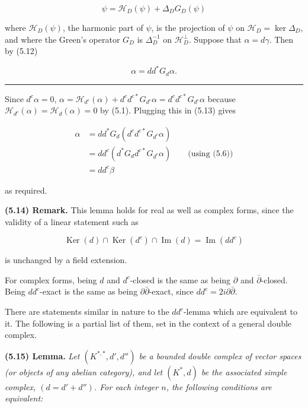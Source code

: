 \documentclass[
  english,
  a3paper,
  a3paper]{extarticle}
\begin{document}
\[\tag{5.12}\psi=\mathcal H_D(\psi)+\Delta_DG_D(\psi)\]

where \(\mathcal H_D(\psi)\), the harmonic part of \(\psi\), is the
projection of \(\psi\) on \(\mathcal H_D=\ker\Delta_D\), and where the
Green's operator \(G_D\) is \(\Delta_D^{-1}\) on \(\mathcal H_D^\perp\).
Suppose that \(\alpha=d\gamma\). Then by (5.12)

\[\tag{5.13}\alpha=dd^*G_d\alpha.\]

\clearpage



\par

\vspace{0.7mm}\hrule\vspace{1.6mm}

\fontsize{9}{11}\selectfont

Since \(d^c\alpha=0\),
\(\alpha=\mathcal H_{d^c}(\alpha)+d^cd^{c*}G_{d^c}\alpha=d^cd^{c*}G_{d^c}\alpha\)
because \(\mathcal H_{d^c}(\alpha)=\mathcal H_d(\alpha)=0\) by (5.1).
Plugging this in (5.13) gives

\[\begin{aligned}\alpha&=dd^*G_d(d^cd^{c*}G_{d^c}\alpha)\\&=dd^c(d^*G_dd^{c*}G_{d^c}\alpha)\qquad\text{(using (5.6))}\\&=dd^c\beta\end{aligned}\]

as required.

\textbf{(5.14) Remark.} This lemma holds for real as well as complex
forms, since the validity of a linear statement such as

\[\operatorname{Ker}(d)\cap\operatorname{Ker}(d^c)\cap\operatorname{Im}(d)=\operatorname{Im}(dd^c)\]

is unchanged by a field extension.

For complex forms, being \(d\) and \(d^c\)-closed is the same as being
\(\partial\) and \(\bar\partial\)-closed. Being \(dd^c\)-exact is the
same as being \(\partial\bar\partial\)-exact, since
\(dd^c=2i\partial\bar\partial\).

There are statements similar in nature to the \(dd^c\)-lemma which are
equivalent to it. The following is a partial list of them, set in the
context of a general double complex.

\textbf{(5.15) Lemma.} \emph{Let \((K^{*,*},d',d'')\) be a bounded
double complex of vector spaces (or objects of any abelian category),
and let \((K^*,d)\) be the associated simple complex, \((d=d'+d'')\).
For each integer \(n\), the following conditions are equivalent:}
\end{document}
